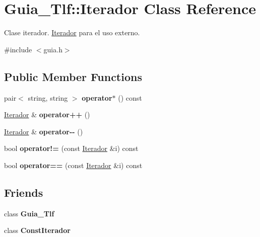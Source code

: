 \hypertarget{classGuia__Tlf_1_1Iterador}{}\section{Guia\+\_\+\+Tlf\+:\+:Iterador Class Reference}
\label{classGuia__Tlf_1_1Iterador}


Clase iterador. \hyperlink{classGuia__Tlf_1_1Iterador}{Iterador} para el uso externo.  




{\ttfamily \#include $<$guia.\+h$>$}

\subsection*{Public Member Functions}
\begin{DoxyCompactItemize}
\item 
\mbox{\label{classGuia__Tlf_1_1Iterador_a01fa6b6c00236f85acb4caca10c773e1}} 
pair$<$ string, string $>$ {\bfseries operator$\ast$} () const
\item 
\mbox{\label{classGuia__Tlf_1_1Iterador_a5fc2c3a8b6086cb844908c43be89ae46}} 
\hyperlink{classGuia__Tlf_1_1Iterador}{Iterador} \& {\bfseries operator++} ()
\item 
\mbox{\label{classGuia__Tlf_1_1Iterador_a2635230ea2357dc530929fea0cc87424}} 
\hyperlink{classGuia__Tlf_1_1Iterador}{Iterador} \& {\bfseries operator-\/-\/} ()
\item 
\mbox{\label{classGuia__Tlf_1_1Iterador_ad9c624dc79f0d1fad65e8ca6f9818088}} 
bool {\bfseries operator!=} (const \hyperlink{classGuia__Tlf_1_1Iterador}{Iterador} \&i) const
\item 
\mbox{\label{classGuia__Tlf_1_1Iterador_a66fef87b500db8500f7d3b23a89d9eaf}} 
bool {\bfseries operator==} (const \hyperlink{classGuia__Tlf_1_1Iterador}{Iterador} \&i) const
\end{DoxyCompactItemize}
\subsection*{Friends}
\begin{DoxyCompactItemize}
\item 
\mbox{\label{classGuia__Tlf_1_1Iterador_a4349d7a1b26a0aa94447235f95b2f940}} 
class {\bfseries Guia\+\_\+\+Tlf}
\item 
\mbox{\label{classGuia__Tlf_1_1Iterador_ab9064d3689232b6232bedd3a17920205}} 
class {\bfseries Const\+Iterador}
\end{DoxyCompactItemize}


